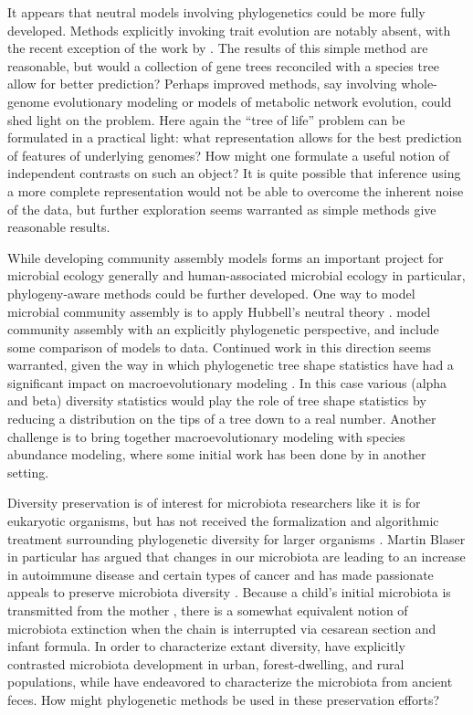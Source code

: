 \documentclass{amsart}
\begin{document}
It appears that neutral models involving phylogenetics could be more fully developed.
Methods explicitly invoking trait evolution are notably absent, with the recent exception of the work by \citet{langille2013predictive}.
The results of this simple method are reasonable, but would a collection of gene trees reconciled with a species tree allow for better prediction?
Perhaps improved methods, say involving whole-genome evolutionary modeling or models of metabolic network evolution, could shed light on the problem.
Here again the ``tree of life'' problem can be formulated in a practical light: what representation allows for the best prediction of features of underlying genomes?
How might one formulate a useful notion of independent contrasts \citep{felsenstein1985phylogenies} on such an object?
It is quite possible that inference using a more complete representation would not be able to overcome the inherent noise of the data, but further exploration seems warranted as simple methods give reasonable results.

While developing community assembly models forms an important project for microbial ecology generally and human-associated microbial ecology in particular, phylogeny-aware methods could be further developed.
One way to model microbial community assembly is to apply Hubbell's neutral theory \citep{costello2012application,fierer2012animalcules}.
\citet{o2012phylogenetic} model community assembly with an explicitly phylogenetic perspective, and include some comparison of models to data.
Continued work in this direction seems warranted, given the way in which phylogenetic tree shape statistics have had a significant impact on macroevolutionary modeling \citep{mooers1997inferring,aldous2011five}.
In this case various (alpha and beta) diversity statistics would play the role of tree shape statistics by reducing a distribution on the tips of a tree down to a real number.
Another challenge is to bring together macroevolutionary modeling with species abundance modeling, where some initial work has been done by \citet{lambert2013predicting} in another setting.

Diversity preservation is of interest for microbiota researchers like it is for eukaryotic organisms, but has not received the formalization and algorithmic treatment surrounding phylogenetic diversity for larger organisms \citep{hartmann2006maximizing,pardi2007resource}.
Martin Blaser in particular has argued that changes in our microbiota are leading to an increase in autoimmune disease and certain types of cancer \citep[reviewed in][]{cho2012human} and has made passionate appeals to preserve microbiota diversity \citep{blaser2011antibiotic}.
Because a child's initial microbiota is transmitted from the mother \citep[reviewed in][]{funkhouser2013mom}, there is a somewhat equivalent notion of microbiota extinction when the chain is interrupted via cesarean section and infant formula.
In order to characterize extant diversity, \citet{yatsunenko2012human} have explicitly contrasted microbiota development in urban, forest-dwelling, and rural populations, while \citet{tito2012insights} have endeavored to characterize the microbiota from ancient feces.
How might phylogenetic methods be used in these preservation efforts?
\end{document}
